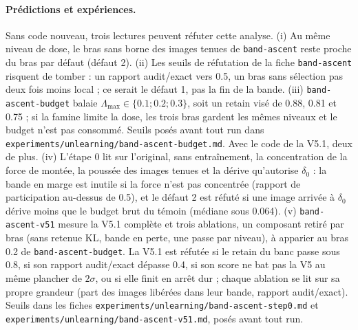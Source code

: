 \documentclass[11pt,a4paper]{article}
\newcommand{\code}[1]{\texttt{#1}}
\newcommand{\chemin}[1]{\nolinkurl{#1}}%
\begin{document}
\paragraph{Prédictions et expériences.} Sans code nouveau, trois lectures peuvent réfuter
cette analyse. (i) Au même niveau de dose, le bras sans borne des images tenues de
\code{band-ascent} reste proche du bras par défaut (défaut 2). (ii) Les seuils de réfutation de la
fiche \code{band-ascent} risquent de tomber : un rapport audit/exact vers \num{0.5}, un bras sans
sélection pas deux fois moins local ; ce serait le défaut 1, pas la fin de la bande. (iii)
\code{band-ascent-budget} balaie $\Lambda_{\max}\in\{\num{0.1};\num{0.2};\num{0.3}\}$, soit un retain
visé de \num{0.88}, \num{0.81} et \num{0.75} ; si la famine limite la dose, les trois bras gardent les
mêmes niveaux et le budget n'est pas consommé. Seuils posés avant tout run dans
\chemin{experiments/unlearning/band-ascent-budget.md}. Avec le code de la V5.1, deux de plus. (iv)
L'étape 0 lit sur l'original, sans entraînement, la concentration de la force de montée, la poussée
des images tenues et la dérive qu'autorise $\delta_0$ : la bande en marge est inutile si la force
n'est pas concentrée (rapport de participation au-dessus de \num{0.5}), et le défaut 2 est réfuté si
une image arrivée à $\delta_0$ dérive moins que le budget brut du témoin (médiane sous \num{0.064}).
(v) \code{band-ascent-v51} mesure la V5.1 complète et trois ablations, un composant retiré par bras
(sans retenue KL, bande en perte, une passe par niveau), à apparier au bras \num{0.2} de
\code{band-ascent-budget}. La V5.1 est réfutée si le retain du banc passe sous \num{0.8}, si son
rapport audit/exact dépasse \num{0.4}, si son score ne bat pas la V5 au même plancher de $2\sigma$,
ou si elle finit en arrêt dur ; chaque ablation se lit sur sa propre grandeur (part des images
libérées dans leur bande, rapport audit/exact). Seuils dans les fiches
\chemin{experiments/unlearning/band-ascent-step0.md} et
\chemin{experiments/unlearning/band-ascent-v51.md}, posés avant tout run.
\end{document}
